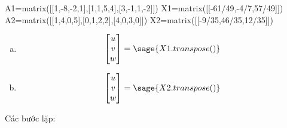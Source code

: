 \documentclass[12pt]{article}
\begin{document}
\begin{sagesilent}
A1=matrix([[1,-8,-2,1],[1,1,5,4],[3,-1,1,-2]])
X1=matrix([[-61/49,-4/7,57/49]])
A2=matrix([[1,4,0,5],[0,1,2,2],[4,0,3,0]])
X2=matrix([[-9/35,46/35,12/35]])
\end{sagesilent}

\begin{enumerate}[a)]
\item \begin{equation}
\begin{bmatrix}u\\v\\w\end{bmatrix}=\sage{X1.transpose()}
\end{equation}

\item \begin{equation}
\begin{bmatrix}u\\v\\w\end{bmatrix}=\sage{X2.transpose()}
\end{equation}
\end{enumerate}

Các bước lặp:
\end{document}
